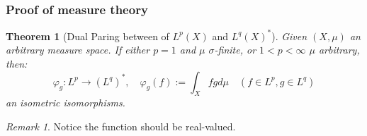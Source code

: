 \documentclass[a4paper,11pt,fleqn]{book}
\newtheorem{theorem}{Theorem}[section]
\theoremstyle{definition}
\theoremstyle{remark}
\newtheorem*{remark}{Remark}
\begin{document}
\subsubsection*{Proof of measure theory}
\begin{theorem}[Dual Paring between of $L^p(X)$ and $L^q(X)^*$] Given $(X, \mu)$ an arbitrary measure space. 
	If either $p = 1$ and $\mu$ $\sigma$-finite, or $1 < p < \infty$ $\mu$ arbitrary, then:
	\begin{equation*}
		\varphi_g: L^p \rightarrow (L^q)^*, \quad \varphi_g(f) := \int_X fg d\mu \quad (f \in L^p, g \in L^q)
	\end{equation*}
	an isometric isomorphisms. 
\end{theorem}
\begin{remark}
Notice the function should be real-valued.	
\end{remark}
\end{document}
